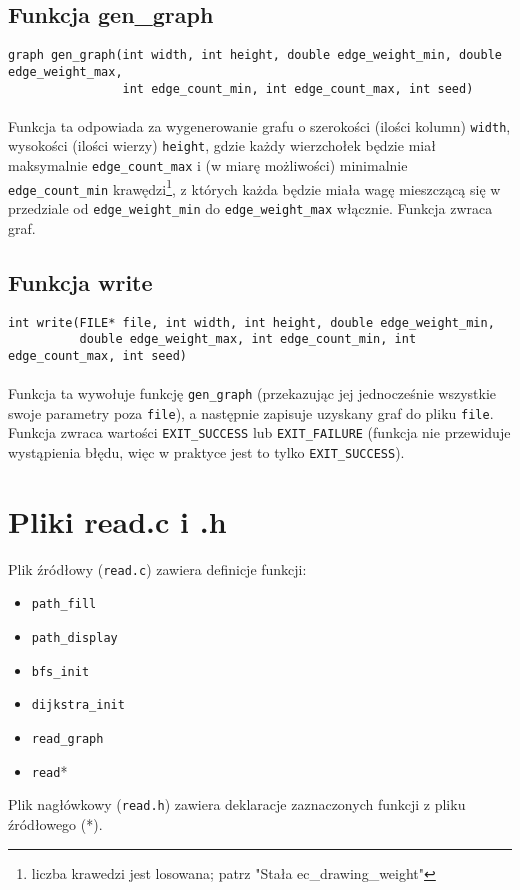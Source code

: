 \documentclass[11pt,a4paper]{report}
\begin{document}
    \subsection{Funkcja gen\_graph}
    \verb|graph gen_graph(int width, int height, double edge_weight_min, double edge_weight_max,|\\
    \verb|                int edge_count_min, int edge_count_max, int seed)|\\
    \\
    Funkcja ta odpowiada za wygenerowanie grafu o szerokości (ilości kolumn) \verb|width|, wysokości (ilości wierzy) \verb|height|, gdzie każdy wierzchołek będzie miał maksymalnie \verb|edge_count_max| i (w miarę możliwości) minimalnie \verb|edge_count_min| krawędzi\footnote{liczba krawedzi jest losowana; patrz "Stała ec\_drawing\_weight"}, z których każda będzie miała wagę mieszczącą się w przedziale od \verb|edge_weight_min| do \verb|edge_weight_max| włącznie. Funkcja zwraca graf.\\
    \subsection{Funkcja write}
    \verb|int write(FILE* file, int width, int height, double edge_weight_min,|\\
    \verb|          double edge_weight_max, int edge_count_min, int edge_count_max, int seed)|\\
    \\
    Funkcja ta wywołuje funkcję \verb|gen_graph| (przekazując jej jednocześnie wszystkie swoje parametry poza \verb|file|), a następnie zapisuje uzyskany graf do pliku \verb|file|. Funkcja zwraca wartości \verb|EXIT_SUCCESS| lub \verb|EXIT_FAILURE| (funkcja nie przewiduje wystąpienia błędu, więc w praktyce jest to tylko \verb|EXIT_SUCCESS|).

    \newpage
    \section{Pliki read.c i .h}
    Plik źródłowy (\verb|read.c|) zawiera definicje funkcji:
    \begin{itemize}
        \item \verb|path_fill|
        \item \verb|path_display|
        \item \verb|bfs_init|
        \item \verb|dijkstra_init|
        \item \verb|read_graph|
        \item \verb|read|*
    \end{itemize}
    Plik nagłówkowy (\verb|read.h|) zawiera deklaracje zaznaczonych funkcji z pliku źródłowego (*).\\
\end{document}
